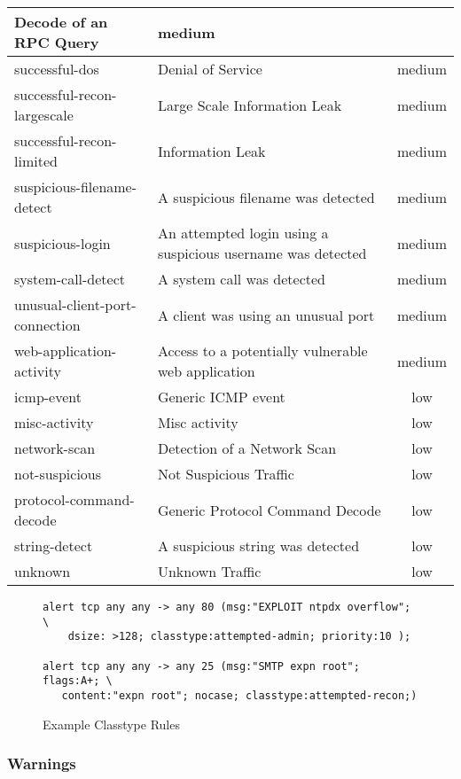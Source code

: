 \documentclass[english]{report}
\begin{document}
\begin{center}
\begin{longtable}{|p{2in}|p{2.5in}|c|}
Decode of an RPC Query & medium\\
\hline 
successful-dos&
Denial of Service & medium\\
\hline 
successful-recon-largescale&
Large Scale Information Leak & medium\\
\hline 
successful-recon-limited&
Information Leak & medium\\
\hline 
suspicious-filename-detect&
A suspicious filename was detected & medium\\
\hline 
suspicious-login&
An attempted login using a suspicious username was detected & medium\\
\hline 
system-call-detect&
A system call was detected & medium\\
\hline 
unusual-client-port-connection&
A client was using an unusual port & medium\\
\hline 
web-application-activity&
Access to a potentially vulnerable web application & medium\\
\hline
icmp-event&
Generic ICMP event & low\\
\hline 
misc-activity&
Misc activity & low\\
\hline 
network-scan&
Detection of a Network Scan & low\\
\hline 
not-suspicious&
Not Suspicious Traffic & low\\
\hline 
protocol-command-decode&
Generic Protocol Command Decode & low\\
\hline 
string-detect&
A suspicious string was detected & low\\
\hline 
unknown&
Unknown Traffic & low\\
\hline
\end{longtable}
\end{center}


\begin{figure}[!hbpt]
\begin{verbatim}
alert tcp any any -> any 80 (msg:"EXPLOIT ntpdx overflow"; \ 
    dsize: >128; classtype:attempted-admin; priority:10 );

alert tcp any any -> any 25 (msg:"SMTP expn root"; flags:A+; \
   content:"expn root"; nocase; classtype:attempted-recon;)
\end{verbatim}
\caption{Example Classtype Rules\label{example classification rules}}
\end{figure}

\subsubsection{Warnings}
\end{document}
